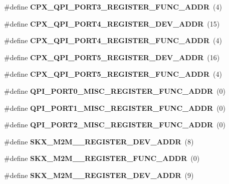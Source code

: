 \begin{DoxyCompactItemize}
\item 
\mbox{\label{types_8h_a87fba6c411c608b2922d63e59d4fff29}} 
\#define {\bfseries C\+P\+X\+\_\+\+Q\+P\+I\+\_\+\+P\+O\+R\+T3\+\_\+\+R\+E\+G\+I\+S\+T\+E\+R\+\_\+\+F\+U\+N\+C\+\_\+\+A\+D\+DR}~(4)
\item 
\mbox{\label{types_8h_a58d59e2ef631bd76738f4575db25e0a3}} 
\#define {\bfseries C\+P\+X\+\_\+\+Q\+P\+I\+\_\+\+P\+O\+R\+T4\+\_\+\+R\+E\+G\+I\+S\+T\+E\+R\+\_\+\+D\+E\+V\+\_\+\+A\+D\+DR}~(15)
\item 
\mbox{\label{types_8h_a1098b7fb34648efe40f312c385f973ea}} 
\#define {\bfseries C\+P\+X\+\_\+\+Q\+P\+I\+\_\+\+P\+O\+R\+T4\+\_\+\+R\+E\+G\+I\+S\+T\+E\+R\+\_\+\+F\+U\+N\+C\+\_\+\+A\+D\+DR}~(4)
\item 
\mbox{\label{types_8h_a8c1b1eef137cd00883cd8e0dcfe1b513}} 
\#define {\bfseries C\+P\+X\+\_\+\+Q\+P\+I\+\_\+\+P\+O\+R\+T5\+\_\+\+R\+E\+G\+I\+S\+T\+E\+R\+\_\+\+D\+E\+V\+\_\+\+A\+D\+DR}~(16)
\item 
\mbox{\label{types_8h_a0ca2cd090b822e117b5a4e24d2249e3f}} 
\#define {\bfseries C\+P\+X\+\_\+\+Q\+P\+I\+\_\+\+P\+O\+R\+T5\+\_\+\+R\+E\+G\+I\+S\+T\+E\+R\+\_\+\+F\+U\+N\+C\+\_\+\+A\+D\+DR}~(4)
\item 
\mbox{\label{types_8h_a23fe612ba535c6d639bbcecd980ff340}} 
\#define {\bfseries Q\+P\+I\+\_\+\+P\+O\+R\+T0\+\_\+\+M\+I\+S\+C\+\_\+\+R\+E\+G\+I\+S\+T\+E\+R\+\_\+\+F\+U\+N\+C\+\_\+\+A\+D\+DR}~(0)
\item 
\mbox{\label{types_8h_a7d4c95f2092d55b5e9f61255997f73f4}} 
\#define {\bfseries Q\+P\+I\+\_\+\+P\+O\+R\+T1\+\_\+\+M\+I\+S\+C\+\_\+\+R\+E\+G\+I\+S\+T\+E\+R\+\_\+\+F\+U\+N\+C\+\_\+\+A\+D\+DR}~(0)
\item 
\mbox{\label{types_8h_a35242ec7f0ef05f8388dd6215dce5fdd}} 
\#define {\bfseries Q\+P\+I\+\_\+\+P\+O\+R\+T2\+\_\+\+M\+I\+S\+C\+\_\+\+R\+E\+G\+I\+S\+T\+E\+R\+\_\+\+F\+U\+N\+C\+\_\+\+A\+D\+DR}~(0)
\item 
\mbox{\label{types_8h_af692c31078567da378def1f4b716abe9}} 
\#define {\bfseries S\+K\+X\+\_\+\+M2\+M\+\_\+\_\+\+R\+E\+G\+I\+S\+T\+E\+R\+\_\+\+D\+E\+V\+\_\+\+A\+D\+DR}~(8)
\item 
\mbox{\label{types_8h_ad05a6b4296eff701df9dbb94ee6179a5}} 
\#define {\bfseries S\+K\+X\+\_\+\+M2\+M\+\_\+\_\+\+R\+E\+G\+I\+S\+T\+E\+R\+\_\+\+F\+U\+N\+C\+\_\+\+A\+D\+DR}~(0)
\item 
\mbox{\label{types_8h_a71fc9cefeb031fbcac10e88f0f42bf6a}} 
\#define {\bfseries S\+K\+X\+\_\+\+M2\+M\+\_\+\_\+\+R\+E\+G\+I\+S\+T\+E\+R\+\_\+\+D\+E\+V\+\_\+\+A\+D\+DR}~(9)
\item 

\end{DoxyCompactItemize}
